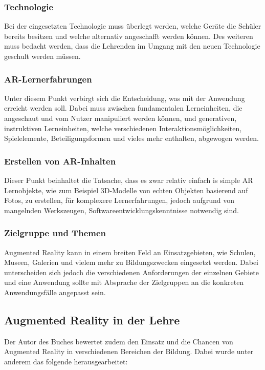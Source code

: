 \subsubsection{Technologie}
Bei der eingesetzten Technologie muss überlegt werden, welche Geräte die Schüler bereits besitzen und welche alternativ angeschafft werden können. Des weiteren muss bedacht werden, dass die Lehrenden im Umgang mit den neuen Technologie geschult werden müssen.
\subsubsection{AR-Lernerfahrungen}
Unter diesem Punkt verbirgt sich die Entscheidung, was mit der Anwendung erreicht werden soll. Dabei muss zwischen fundamentalen Lerneinheiten, die angeschaut und vom Nutzer manipuliert werden können, und generativen, instruktiven Lerneinheiten, welche verschiedenen Interaktionsmöglichkeiten, Spielelemente, Beteiligungsformen und vieles mehr enthalten,  abgewogen werden. 
\subsubsection{Erstellen von AR-Inhalten}
Dieser Punkt beinhaltet die Tatsache, dass es zwar relativ einfach is simple AR Lernobjekte, wie zum Beispiel 3D-Modelle von echten Objekten basierend auf Fotos, zu erstellen, für komplexere Lernerfahrungen, jedoch aufgrund von mangelnden Werkszeugen, Softwareentwicklungskenntnisse notwendig sind.
\subsubsection{Zielgruppe und Themen}
Augmented Reality kann in einem breiten Feld an Einsatzgebieten, wie Schulen, Museen, Galerien und vielem mehr zu Bildungszwecken eingesetzt werden. Dabei unterscheiden sich jedoch die verschiedenen Anforderungen der einzelnen Gebiete und eine Anwendung sollte mit Absprache der Zielgruppen an die konkreten Anwendungsfälle angepasst sein.

\subsection{Augmented Reality in der Lehre}
Der Autor des Buches bewertet zudem den Einsatz und die Chancen von Augmented Reality in verschiedenen Bereichen der Bildung. Dabei wurde unter anderem das folgende herausgearbeitet: 

